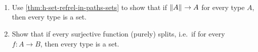 \documentclass[hott-all.tex]{subfiles}
\begin{document}
\begin{ex}\
  \begin{enumerate}
    \item Use \cref{thm:h-set-refrel-in-paths-sets} to show
    that if $\mathopen{}\left\Vert A\right\Vert_{}\mathclose{}\to A$ for every type $A$,
    then every type is a set.
    \item Show that if every surjective function (purely) splits,
    i.e.~if
    for every $f:A\to B$, then every type is a set.
  \end{enumerate}
\end{ex}
\end{document}
